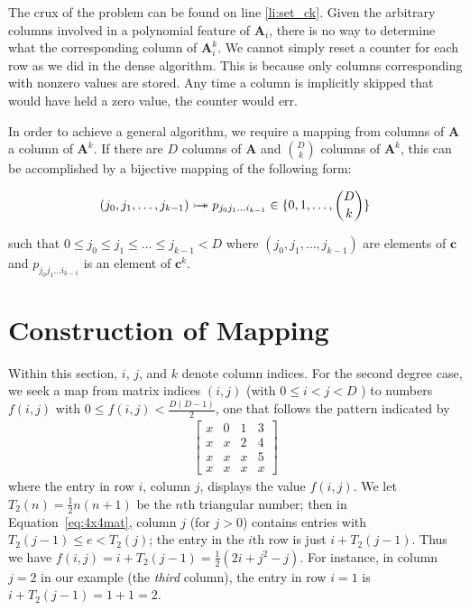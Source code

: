 \documentclass{article} %
\begin{document}
The crux of the problem can be found on line \ref{li:set_ck}.
Given the arbitrary columns involved in a polynomial feature of $\bm{A}_i$, there is no way to determine what the corresponding column of $\bm{A}^k_i$.
We cannot simply reset a counter for each row as we did in the dense algorithm.
This is because only columns corresponding with nonzero values are stored.
Any time a column is implicitly skipped that would have held a zero value, the counter would err.

In order to achieve a general algorithm, we require a mapping from columns of $\bm{A}$ a column of $\bm{A}^k$.
If there are $D$ columns of $\bm{A}$ and $\binom{D}{k}$ columns of $\bm{A}^k$, this can be accomplished by a bijective mapping of the following form:

\begin{equation}
(j_0, j_1, \dots, j_{k-1}) \rightarrowtail \hspace{-1.9ex} \twoheadrightarrow p_{j_0j_1 \dots i_{k-1}} \in \{0,1,\dots,\binom{D}{k}\} 
\end{equation}

such that $ 0 \le j_0 \le j_1 \le \dots \le j_{k-1} < D$
where $(j_0, j_1, \dots, j_{k-1})$ are elements of $\bm{c}$ and $p_{j_0j_1 \dots i_{k-1}}$ is an element of $\bm{c}^k$. %

\section{Construction of Mapping}
Within this section, $i$, $j$, and $k$ denote column indices.
For the second degree case, we seek a map from matrix indices $(i, j)$ (with $0 \le i < j < D$ ) to numbers $f(i, j)$ with $0 \le f(i, j) < \frac{D(D-1)}{2}$, one that follows the pattern indicated by 
\begin{align}
\begin{bmatrix}
x & 0 & 1 & 3 \\
x & x & 2 & 4 \\
x & x & x & 5 \\
x & x & x & x
\end{bmatrix}
\label{eq:4x4mat}
\end{align}
where the entry in row $i$, column $j$, displays the value $f(i, j)$. We let $T_2(n) = \frac{1}{2} n(n+1)$ 
be the $n$th triangular number; then in Equation~\ref{eq:4x4mat}, column $j$ (for $j > 0$) contains entries with  
$T_2(j-1) \le e < T_2(j)$; the entry in the $i$th row is just $i + T_2(j-1)$. Thus we have
$
f(i, j) 
= i + T_2(j-1) =  \frac{1}{2}(2i + j^2-j).$
For instance, in column $j = 2$ in our example (the \emph{third} column), the entry in row $i = 1$ is 
$i + T_2(j-1) = 1 + 1 = 2$. 
\end{document}
